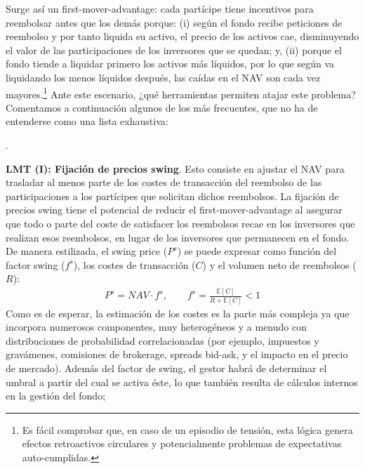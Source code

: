 \documentclass[10pt,a4paper]{article}
\newcounter{numitem}
\newenvironment{lnum}
      {\begin{list}{\arabic{numitem}.}{%
          \usecounter{numitem}%
          \setlength{\leftmargin}{1cm}%
          \setlength{\parskip}{3pt}%
          \setlength{\itemsep}{0pt}%
          \setlength{\parsep}{0pt}%
      }}
      {\end{list}}
\begin{document}
Surge así un first-mover-advantage: cada partícipe tiene incentivos para reembolsar antes que los demás porque: (i) según el fondo recibe peticiones de reembolso y por tanto liquida su activo, el precio de los activos cae, disminuyendo el valor de las participaciones de los inversores que se quedan; y, (ii) porque el fondo tiende a liquidar primero los activos más líquidos, por lo que según va liquidando los menos líquidos después, las caídas en el NAV son cada vez mayores.\footnote{%
    Es fácil comprobar que, en caso de un episodio de tensión, esta lógica genera efectos retroactivos circulares y potencialmente problemas de expectativas auto-cumplidas.
} Ante este escenario, ¿qué herramientas permiten atajar este problema? Comentamos a continuación algunos de los más frecuentes, que no ha de entenderse como una lista exhaustiva:
\begin{lnum}
    \item \textbf{LMT (I): Fijación de precios swing}. Esto consiste en ajustar el NAV para trasladar al menos parte de los costes de transacción del reembolso de las participaciones a los partícipes que solicitan dichos reembolsos. La fijación de precios swing tiene el potencial de reducir el first-mover-advantage al asegurar que todo o parte del coste de satisfacer los reembolsos recae en los inversores que realizan esos reembolsos, en lugar de los inversores que permanecen en el fondo. De manera estilizada, el swing price ($P^s$) se puede expresar como función del factor swing ($f^s$), los costes de transacción ($C$) y el volumen neto de reembolsos ($R$):
    $$\begin{aligned}
        P^s=NAV\cdot f^s,\qquad f^s=\frac{\mathbb E[C]}{R+\mathbb E[C]}<1
    \end{aligned}$$
    Como es de esperar, la estimación de los costes es la parte más compleja ya que incorpora numerosos componentes, muy heterogéneos y a menudo con distribuciones de probabilidad correlacionadas (por ejemplo, impuestos y gravámenes, comisiones de brokerage, spreads bid-ask, y el impacto en el precio de mercado). Además del factor de swing, el gestor habrá de determinar el umbral a partir del cual se activa éste, lo que también resulta de cálculos internos en la gestión del fondo;

\end{lnum}
\end{document}
